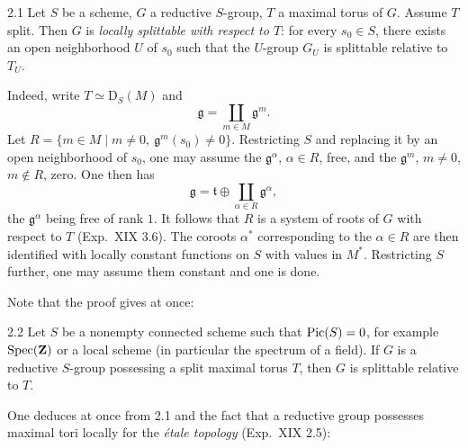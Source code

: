 \label{XXII.sec.2}
\begin{proposition}{2.1}\label{XXII.2.1}
Let $S$ be a scheme, $G$ a reductive $S$-group, $T$ a maximal torus of $G$. Assume $T$ split. Then $G$ is \emph{locally splittable with respect to $T$}: for every $s_0\in S$, there exists an open neighborhood $U$ of $s_0$ such that the $U$-group $G_U$ is splittable relative to $T_U$.
\end{proposition}
Indeed, write $T\simeq\mathrm D_S(M)$ and
\[
\mathfrak g=\coprod_{m\in M}\mathfrak g^m.
\]
Let $R=\{m\in M\mid m\ne0,\ \mathfrak g^m(s_0)\ne0\}$. Restricting $S$ and replacing it by an open neighborhood of $s_0$, one may assume the $\mathfrak g^\alpha$, $\alpha\in R$, free, and the $\mathfrak g^m$, $m\ne0$, $m\notin R$, zero. One then has
\[
\mathfrak g=\mathfrak t\oplus\coprod_{\alpha\in R}\mathfrak g^\alpha,
\]
the $\mathfrak g^\alpha$ being free of rank $1$. It follows that $R$ is a system of roots of $G$ with respect to $T$ (Exp.~XIX 3.6). The coroots $\alpha^*$ corresponding to the $\alpha\in R$ are then identified with locally constant functions on $S$ with values in $M^*$. Restricting $S$ further, one may assume them constant and one is done.

Note that the proof gives at once:
\begin{proposition}{2.2}\label{XXII.2.2}
Let $S$ be a nonempty connected scheme such that $\operatorname{Pic}(S)=0$, for example $\operatorname{Spec}(\mathbf{Z})$ or a local scheme (in particular the spectrum of a field). If $G$ is a reductive $S$-group possessing a split maximal torus $T$, then $G$ is splittable relative to $T$.
\end{proposition}
One deduces at once from 2.1 and the fact that a reductive group possesses maximal tori locally for the \emph{\'etale topology} (Exp.~XIX 2.5):
